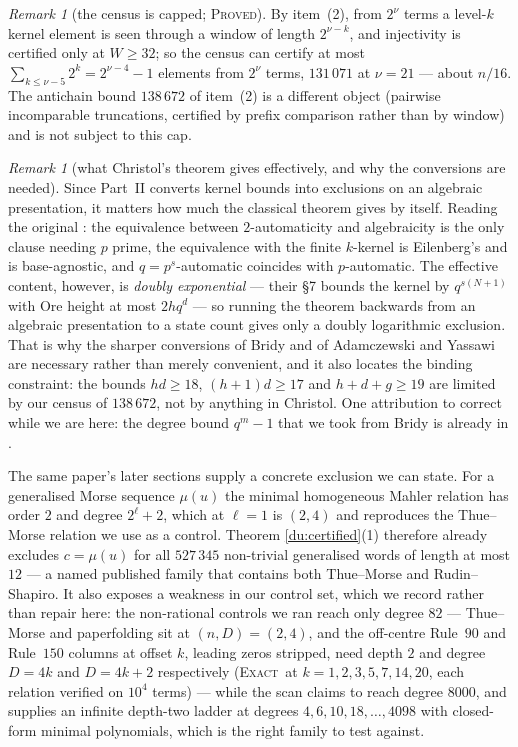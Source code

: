 \documentclass[11pt]{article}
\theoremstyle{definition}
\theoremstyle{remark}
\newtheorem{remark}[theorem]{Remark}
\newcommand{\PROVED}{\textsc{Proved}}
\newcommand{\EXACT}{\textsc{Exact}}
\begin{document}
\begin{remark}[the census is capped; \PROVED]\label{du:rem:census}
By item~(2), from $2^{\nu}$ terms a level-$k$ kernel element is seen through a window of length $2^{\nu-k}$, and injectivity is certified only at $W\ge32$; so the census can certify at most $\sum_{k\le\nu-5}2^{k}=2^{\nu-4}-1$ elements from $2^{\nu}$ terms, $131\,071$ at $\nu=21$ --- about $n/16$. The antichain bound $138\,672$ of item~(2) is a different object (pairwise incomparable truncations, certified by prefix comparison rather than by window) and is not subject to this cap.
\end{remark}
\begin{remark}[what Christol's theorem gives effectively, and why the conversions are needed]\label{du:christoleff}
Since Part~II converts kernel bounds into exclusions on an algebraic presentation, it matters how much
the classical theorem gives by itself. Reading the original \cite{CKMFR}: the equivalence between
$2$-automaticity and algebraicity is the only clause needing $p$ prime, the equivalence with the finite
$k$-kernel is Eilenberg's \cite{Eilenberg} and is base-agnostic, and $q=p^{s}$-automatic coincides with $p$-automatic. The
effective content, however, is \emph{doubly exponential} --- their \S7 bounds the kernel by
$q^{s(N+1)}$ with Ore height at most $2hq^{d}$ --- so running the theorem backwards from an algebraic
presentation to a state count gives only a doubly logarithmic exclusion. That is why the sharper
conversions of Bridy and of Adamczewski and Yassawi are necessary rather than merely convenient, and it
also locates the binding constraint: the bounds $hd\ge18$, $(h+1)d\ge17$ and $h+d+g\ge19$ are limited
by our census of $138\,672$, not by anything in Christol. One attribution to correct while we are here:
the degree bound $q^{m}-1$ that we took from Bridy is already in \cite[\S6]{CKMFR}.

The same paper's later sections supply a concrete exclusion we can state. For a generalised Morse
sequence $\mu(u)$ the minimal homogeneous Mahler relation has order $2$ and degree $2^{\ell}+2$, which
at $\ell=1$ is $(2,4)$ and reproduces the Thue--Morse relation we use as a control. Theorem
\ref{du:certified}(1) therefore already excludes $c=\mu(u)$ for all $527\,345$ non-trivial generalised
words of length at most $12$ --- a named published family that contains both Thue--Morse and
Rudin--Shapiro. It also exposes a weakness in our control set, which we record rather than repair here:
the non-rational controls we ran reach only degree $82$ --- Thue--Morse and paperfolding sit at $(n,D)=(2,4)$, and the off-centre Rule~$90$ and Rule~$150$ columns at offset $k$, leading zeros stripped, need depth $2$ and degree $D=4k$ and $D=4k+2$ respectively (\EXACT\ at $k=1,2,3,5,7,14,20$, each relation verified on $10^4$ terms) --- while the scan claims to reach degree $8000$, and
\cite{CKMFR} supplies an infinite depth-two ladder at degrees $4,6,10,18,\dots,4098$ with closed-form
minimal polynomials, which is the right family to test against.
\end{remark}
\end{document}
